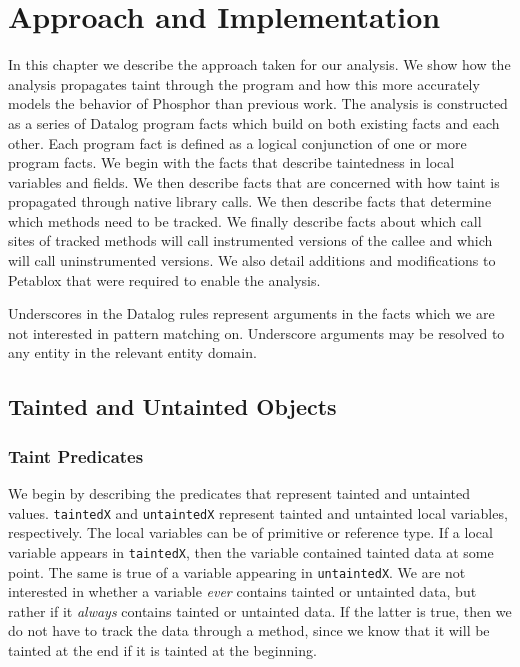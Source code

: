 \chapter{Approach and Implementation}
In this chapter we describe the approach taken for our analysis. We show how the analysis propagates taint through the program and how this more accurately models the behavior of Phosphor than previous work. The analysis is constructed as a series of Datalog program facts which build on both existing facts and each other. Each program fact is defined as a logical conjunction of one or more program facts. We begin with the facts that describe taintedness in local variables and fields. We then describe facts that are concerned with how taint is propagated through native library calls. We then describe facts that determine which methods need to be tracked. We finally describe facts about which call sites of tracked methods will call instrumented versions of the callee and which will call uninstrumented versions. We also detail additions and modifications to Petablox that were required to enable the analysis.

Underscores in the Datalog rules represent arguments in the facts which we are not interested in pattern matching on. Underscore arguments may be resolved to any entity in the relevant entity domain.
\section{Tainted and Untainted Objects}
\subsection{Taint Predicates}
We begin by describing the predicates that represent tainted and untainted values. \texttt{taintedX} and \texttt{untaintedX} represent tainted and untainted local variables, respectively. The local variables can be of primitive or reference type. If a local variable appears in \texttt{taintedX}, then the variable contained tainted data at some point. The same is true of a variable appearing in \texttt{untaintedX}. We are not interested in whether a variable \textit{ever} contains tainted or untainted data, but rather if it \textit{always} contains tainted or untainted data. If the latter is true, then we do not have to track the data through a method, since we know that it will be tainted at the end if it is tainted at the beginning.

